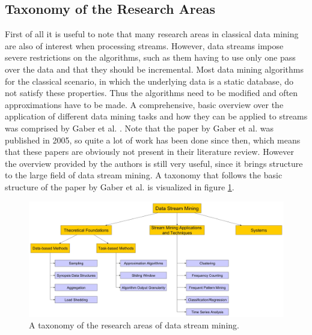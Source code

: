 \subsection{Taxonomy of the Research Areas}
First of all it is useful to note that many research areas in classical data mining are also of interest when processing streams. However, data streams impose severe restrictions on the algorithms, such as them having to use only one pass over the data and that they should be incremental. Most data mining algorithms for the classical scenario, in which the underlying data is a static database, do not satisfy these properties. Thus the algorithms need to be modified and often approximations have to be made. A comprehensive, basic overview over the application of different data mining tasks and how they can be applied to streams was comprised by Gaber et al. \cite{gaber2005mining}. Note that the paper by Gaber et al. was published in 2005, so quite a lot of work has been done since then, which means that these papers are obviously not present in their literature review. However the overview provided by the authors is still very useful, since it brings structure to the large field of data stream mining. A taxonomy that follows the basic structure of the paper by Gaber et al. is visualized in figure \ref{fig_streamMiningTaxonomy}.

\begin{figure}[h]
	\centering
  	\includegraphics[width=\textwidth]{streamMiningTaxonomy}
	\caption{A taxonomy of the research areas of data stream mining.}
	\label{fig_streamMiningTaxonomy}
\end{figure}

